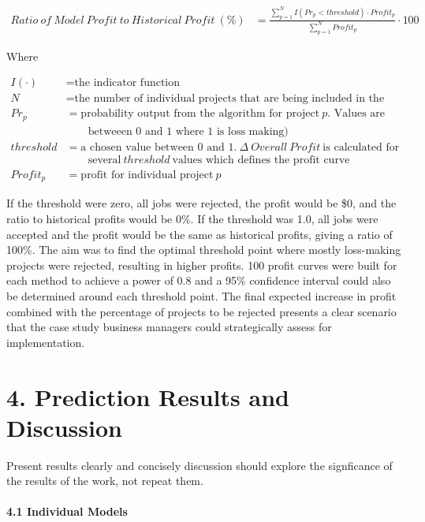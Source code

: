 \documentclass[]{elsarticle} %
\begin{document}
\[
\begin{aligned}
Ratio\ of\ Model\ Profit\ to\ Historical\ Profit\ (\%) &= \frac{\sum_{p = 1}^{N} I(Pr_p < threshold) \cdot Profit_p}{\sum_{p = 1}^{N} Profit_p} \cdot100
\end{aligned}
\]

Where

\[
\begin{aligned}
I(\cdot) &= \textrm{the indicator function} \\
N\ &= \textrm{the number of individual projects that are being included in the analysis} \\
Pr_{p} &= \textrm{probability output from the algorithm for project}\ p \textrm{. Values are}\\
& \qquad \textrm{betweeen 0 and 1 where 1 is loss making)} \\
threshold &= \textrm{a chosen value between 0 and 1.}\ \Delta\ Overall\ Profit\ \textrm{is calculated for} \\
& \qquad \textrm{several}\ threshold\ \textrm{values which defines the profit curve} \\
Profit_p &= \textrm{profit for individual project}\ p
\end{aligned}
\]

If the threshold were zero, all jobs were rejected, the profit would be
\$0, and the ratio to historical profits would be 0\%. If the threshold
was 1.0, all jobs were accepted and the profit would be the same as
historical profits, giving a ratio of 100\%. The aim was to find the
optimal threshold point where mostly loss-making projects were rejected,
resulting in higher profits. 100 profit curves were built for each
method to achieve a power of 0.8 and a 95\% confidence interval could
also be determined around each threshold point. The final expected
increase in profit combined with the percentage of projects to be
rejected presents a clear scenario that the case study business managers
could strategically assess for implementation.

\section{4. Prediction Results and
Discussion}\label{prediction-results-and-discussion}

Present results clearly and concisely discussion should explore the
signficance of the results of the work, not repeat them.

\paragraph{4.1 Individual Models}\label{individual-models}
\end{document}
